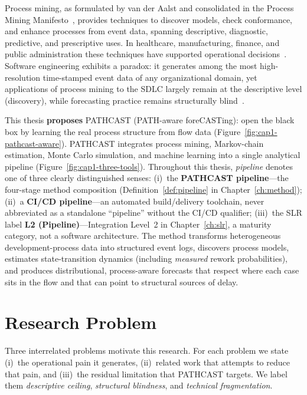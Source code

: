Process mining, as formulated by van der Aalst and consolidated in the
Process Mining Manifesto~\cite{aalst2012process,aalst2016process},
provides techniques to discover models, check conformance, and enhance
processes from event data, spanning descriptive, diagnostic, predictive,
and prescriptive uses.
In healthcare, manufacturing, finance, and public administration these
techniques have supported operational decisions~\cite{aalst2012process}.
Software engineering exhibits a paradox: it generates among the most
high-resolution time-stamped event data of any organizational domain, yet
applications of process mining to the SDLC largely remain at the
descriptive level (discovery), while forecasting practice remains
structurally blind~\cite{cook1998,poncin2011process,rubin2007}.

This thesis \textbf{proposes} PATHCAST (PATH-aware foreCASTing): open the
black box by learning the real process structure from flow data
(Figure~\ref{fig:cap1-pathcast-aware}).
PATHCAST integrates process mining, Markov-chain estimation, Monte Carlo
simulation, and machine learning into a single analytical pipeline
(Figure~\ref{fig:cap1-three-tools}).
Throughout this thesis, \emph{pipeline} denotes one of three clearly
distinguished senses:
(i)~the \textbf{PATHCAST pipeline}---the four-stage method composition
(Definition~\ref{def:pipeline} in Chapter~\ref{ch:method});
(ii)~a \textbf{CI/CD pipeline}---an automated build/delivery toolchain,
never abbreviated as a standalone ``pipeline'' without the CI/CD qualifier;
(iii)~the SLR label \textbf{L2 (Pipeline)}---Integration Level~2 in
Chapter~\ref{ch:slr}, a maturity category, not a software architecture.
The method transforms heterogeneous development-process data into
structured event logs, discovers process models, estimates state-transition
dynamics (including \emph{measured} rework probabilities), and produces
distributional, process-aware forecasts that respect where each case sits
in the flow and that can point to structural sources of delay.


\section{Research Problem}
\label{sec:problem}

Three interrelated problems motivate this research.
For each problem we state (i)~the operational pain it generates,
(ii)~related work that attempts to reduce that pain, and
(iii)~the residual limitation that PATHCAST targets.
We label them \emph{descriptive ceiling}, \emph{structural blindness},
and \emph{technical fragmentation}.

